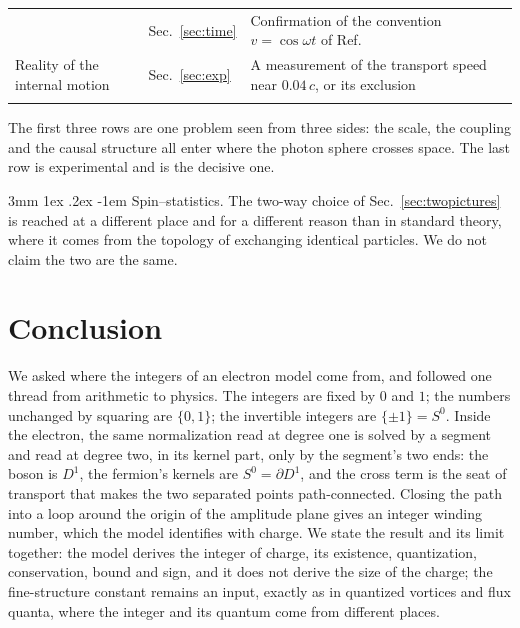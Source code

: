 \documentclass[%
 reprint, amsmath,amssymb, aps, prb, ]{revtex4-2}
\makeatletter
\numberwithin{equation}{section}
\renewcommand\paragraph{%
  \@startsection{paragraph}{4}{\z@}%
    {3mm \@plus 1ex \@minus .2ex}
    {-1em}
    {\normalfont\normalsize\itshape}}
\makeatother
\begin{document}
\begin{table}[t!]
\begin{tabular}{p{3.6cm}p{4.6cm}p{6.8cm}}
& Sec.~\ref{sec:time}
& Confirmation of the convention $v=\cos\omega t$ of Ref.~\cite{ref:p10} \\
\addlinespace[0.15cm]
Reality of the internal motion
& Sec.~\ref{sec:exp}
& A measurement of the transport speed near $0.04\,c$, or its exclusion \\
\addlinespace[0.2cm]
\bottomrule
\end{tabular}
\vspace{0.2cm}
\begin{minipage}{0.95\textwidth}
\justifying\footnotesize
The first three rows are one problem seen from three sides: the scale, the coupling and the causal structure all enter where the photon sphere crosses space. The last row is experimental and is the decisive one.
\end{minipage}
\end{table}

\paragraph{Spin--statistics.} The two-way choice of Sec.~\ref{sec:twopictures} is reached at a different place and for a different reason than in standard theory, where it comes from the topology of exchanging identical particles. We do not claim the two are the same.

\section{Conclusion}
\label{sec:conclusion}

We asked where the integers of an electron model come from, and followed one thread from arithmetic to physics. The integers are fixed by $0$ and $1$; the numbers unchanged by squaring are $\{0,1\}$; the invertible integers are $\{\pm1\}=S^0$. Inside the electron, the same normalization read at degree one is solved by a segment and read at degree two, in its kernel part, only by the segment's two ends: the boson is $D^1$, the fermion's kernels are $S^0=\partial D^1$, and the cross term is the seat of transport that makes the two separated points path-connected. Closing the path into a loop around the origin of the amplitude plane gives an integer winding number, which the model identifies with charge. We state the result and its limit together: the model derives the integer of charge, its existence, quantization, conservation, bound and sign, and it does not derive the size of the charge; the fine-structure constant remains an input, exactly as in quantized vortices and flux quanta, where the integer and its quantum come from different places.
\end{document}
